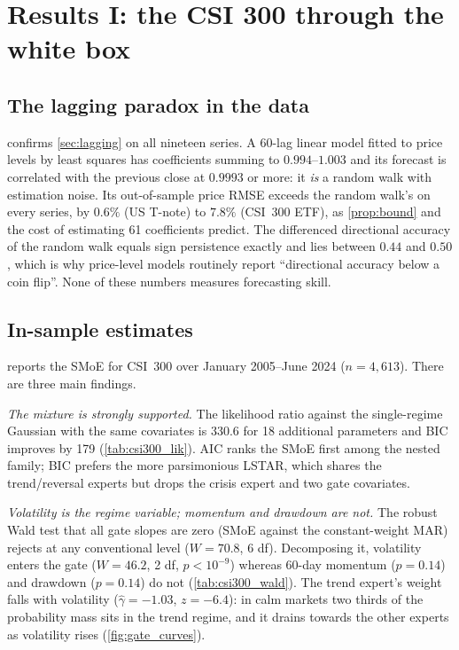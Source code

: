 \section{Results I: the CSI 300 through the white box}\label{sec:results-china}

\subsection{The lagging paradox in the data}
 confirms \cref{sec:lagging} on all nineteen series. A 60-lag linear model fitted
to price levels by least squares has coefficients summing to $0.994$--$1.003$ and its forecast is
correlated with the previous close at $0.9993$ or more: it \emph{is} a random walk with estimation
noise. Its out-of-sample price RMSE exceeds the random walk's on every series, by $0.6\%$ (US
T-note) to $7.8\%$ (CSI~300 ETF), as \cref{prop:bound} and the cost of estimating 61 coefficients
predict. The differenced directional accuracy of the random walk equals sign persistence exactly and
lies between $0.44$ and $0.50$, which is why price-level models routinely report ``directional
accuracy below a coin flip''. None of these numbers measures forecasting skill.

\subsection{In-sample estimates}
 reports the SMoE for CSI~300 over January 2005--June 2024 ($n=4{,}613$).
There are three main findings.

\emph{The mixture is strongly supported.} The likelihood ratio against the single-regime Gaussian
with the same covariates is $330.6$ for 18 additional parameters and BIC improves by 179
(\cref{tab:csi300_lik}). AIC ranks the SMoE first among the nested family; BIC prefers the more
parsimonious LSTAR, which shares the trend/reversal experts but drops the crisis expert and two gate
covariates.

\emph{Volatility is the regime variable; momentum and drawdown are not.} The robust Wald test that
all gate slopes are zero (SMoE against the constant-weight MAR) rejects at any conventional level
($W=70.8$, 6 df). Decomposing it, volatility enters the gate ($W=46.2$, 2 df, $p<10^{-9}$) whereas
60-day momentum ($p=0.14$) and drawdown ($p=0.14$) do not (\cref{tab:csi300_wald}). The trend expert's
weight falls with volatility ($\hat\gamma=-1.03$, $z=-6.4$): in calm markets two thirds of the
probability mass sits in the trend regime, and it drains towards the other experts as volatility rises
(\cref{fig:gate_curves}).

